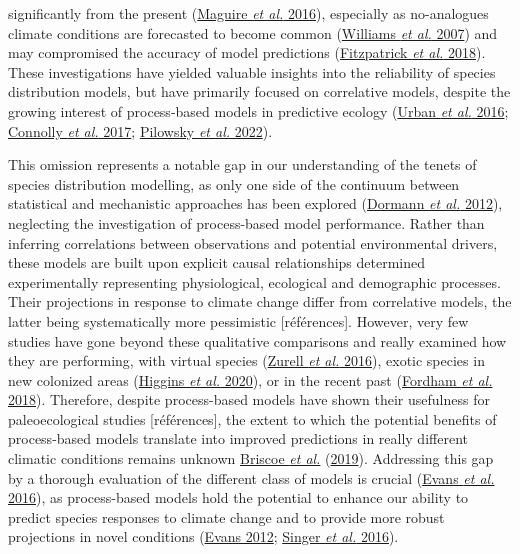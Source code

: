 \documentclass[11pt,]{article}
\begin{document}
significantly from the present
(\protect\hyperlink{ref-Maguire2016}{Maguire \emph{et al.} 2016}),
especially as no-analogues climate conditions are forecasted to become
common (\protect\hyperlink{ref-Williams2007}{Williams \emph{et al.}
2007}) and may compromised the accuracy of model predictions
(\protect\hyperlink{ref-Fitzpatrick2018}{Fitzpatrick \emph{et al.}
2018}). These investigations have yielded valuable insights into the
reliability of species distribution models, but have primarily focused
on correlative models, despite the growing interest of process-based
models in predictive ecology (\protect\hyperlink{ref-Urban2016}{Urban
\emph{et al.} 2016}; \protect\hyperlink{ref-Connolly2017}{Connolly
\emph{et al.} 2017}; \protect\hyperlink{ref-Pilowsky2022}{Pilowsky
\emph{et al.} 2022}).

This omission represents a notable gap in our understanding of the
tenets of species distribution modelling, as only one side of the
continuum between statistical and mechanistic approaches has been
explored (\protect\hyperlink{ref-Dormann2012}{Dormann \emph{et al.}
2012}), neglecting the investigation of process-based model performance.
Rather than inferring correlations between observations and potential
environmental drivers, these models are built upon explicit causal
relationships determined experimentally representing physiological,
ecological and demographic processes. Their projections in response to
climate change differ from correlative models, the latter being
systematically more pessimistic {[}références{]}. However, very few
studies have gone beyond these qualitative comparisons and really
examined how they are performing, with virtual species
(\protect\hyperlink{ref-Zurell2016}{Zurell \emph{et al.} 2016}), exotic
species in new colonized areas
(\protect\hyperlink{ref-Higgins2020}{Higgins \emph{et al.} 2020}), or in
the recent past (\protect\hyperlink{ref-Fordham2018}{Fordham \emph{et
al.} 2018}). Therefore, despite process-based models have shown their
usefulness for paleoecological studies {[}références{]}, the extent to
which the potential benefits of process-based models translate into
improved predictions in really different climatic conditions remains
unknown \protect\hyperlink{ref-Briscoe2019}{Briscoe \emph{et al.}}
(\protect\hyperlink{ref-Briscoe2019}{2019}). Addressing this gap by a
thorough evaluation of the different class of models is crucial
(\protect\hyperlink{ref-Evans2016}{Evans \emph{et al.} 2016}), as
process-based models hold the potential to enhance our ability to
predict species responses to climate change and to provide more robust
projections in novel conditions (\protect\hyperlink{ref-Evans2012}{Evans
2012}; \protect\hyperlink{ref-Singer2016}{Singer \emph{et al.} 2016}).
\end{document}
